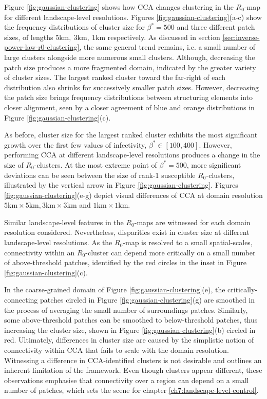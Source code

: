 Figure \ref{fig:gaussian-clustering} shows how CCA changes clustering in the $R_0$-map for different landscape-level resolutions.
Figures \ref{fig:gaussian-clustering}(a-c) show the frequency distributions of cluster size for $\beta^*=500$ and three different patch sizes, of lengths $\mathrm{5km,\ 3km,\ 1km}$ respectively.
As discussed in section \ref{sec:inverse-power-law-r0-clustering}, the same general trend remains, i.e. a small number of large clusters alongside more numerous small clusters.
Although, decreasing the patch size produces a more fragmented domain, indicated by the greater variety of cluster sizes.
The largest ranked cluster toward the far-right of each distribution also shrinks for successively smaller patch sizes.
However, decreasing the patch size brings frequency distributions between structuring elements into closer alignment, seen by a closer agreement of blue and orange distributions in Figure \ref{fig:gaussian-clustering}(c).

As before, cluster size for the largest ranked cluster exhibits the most significant growth over the first few values of infectivity, $\beta^* \in [100, 400]$.
However, performing CCA at different landscape-level resolutions produces a change in the size of $R_0$-clusters.
At the most extreme point of $\beta^*=500$, more significant deviations can be seen between the size of rank-1 susceptible $R_0$-clusters, illustrated by the vertical arrow in Figure \ref{fig:gaussian-clustering}.
Figures \ref{fig:gaussian-clustering}(e-g) depict visual differences of CCA at domain resolution $\mathrm{5km \times 5km, 3km\times 3km}$ and $\mathrm{1km\times 1km}$.

Similar landscape-level features in the $R_0$-maps are witnessed for each domain resolution considered.
Nevertheless, disparities exist in cluster size at different landscape-level resolutions.
As the $R_0$-map is resolved to a small spatial-scales, connectivity within an $R_0$-cluster can depend more critically on a small number of above-threshold patches, identified by the red circles in the inset in Figure \ref{fig:gaussian-clustering}(c).

In the coarse-grained domain of Figure \ref{fig:gaussian-clustering}(e), the critically-connecting patches circled in Figure \ref{fig:gaussian-clustering}(g) 
are smoothed in the process of averaging the small number of surroundings patches. 
Similarly, some above-threshold patches can be smoothed to below-threshold patches, thus increasing the cluster size, shown in Figure \ref{fig:gaussian-clustering}(b) circled in red.
Ultimately, differences in cluster size are caused by the simplistic notion of connectivity within CCA that fails to scale with the domain resolution.
Witnessing a difference in CCA-identified clusters is not desirable and outlines an inherent limitation of the framework.
Even though clusters appear different, these observations emphasise that connectivity over a region can depend on a small number of patches, 
which sets the scene for chapter \ref{ch7:landscape-level-control}.

